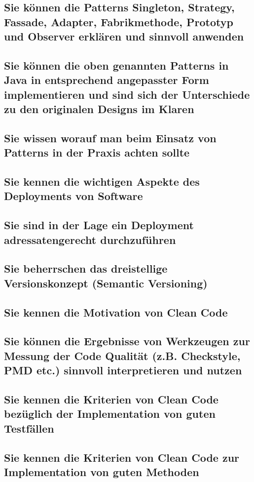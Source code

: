 \subsection{Sie können die Patterns Singleton, Strategy, Fassade, Adapter, Fabrikmethode, Prototyp und Observer erklären und sinnvoll anwenden}
\label{sec:patterns}
\subsection{Sie können die oben genannten Patterns in Java in entsprechend angepasster Form implementieren und sind sich der Unterschiede zu den originalen Designs im Klaren}
\subsection{Sie wissen worauf man beim Einsatz von Patterns in der Praxis achten sollte}
\subsection{Sie kennen die wichtigen Aspekte des Deployments von Software}
\subsection{Sie sind in der Lage ein Deployment adressatengerecht durchzuführen}
\subsection{Sie beherrschen das dreistellige Versionskonzept (Semantic Versioning)}
\subsection{Sie kennen die Motivation von Clean Code}
\subsection{Sie können die Ergebnisse von Werkzeugen zur Messung der Code Qualität (z.B. Checkstyle, PMD etc.) sinnvoll interpretieren und nutzen}
\subsection{Sie kennen die Kriterien von Clean Code bezüglich der Implementation von guten Testfällen}
\subsection{Sie kennen die Kriterien von Clean Code zur Implementation von guten Methoden}